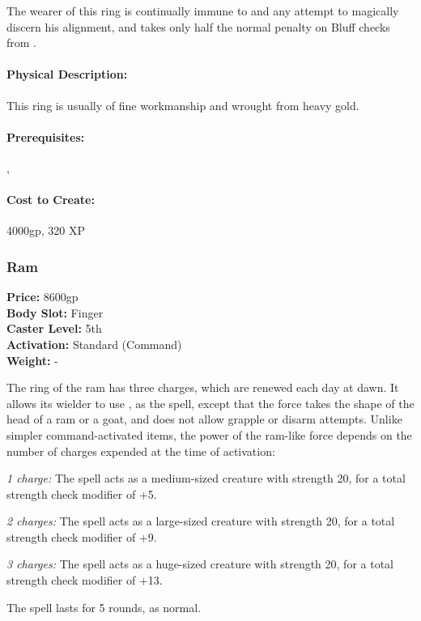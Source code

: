 The wearer of this ring is continually immune to  and any attempt to magically discern his alignment, and takes only half the normal penalty on Bluff checks from .

\paragraph{Physical Description:} This ring is usually of fine workmanship and wrought from heavy gold.

\paragraph{Prerequisites:} , 

\paragraph{Cost to Create:} 4000gp, 320 XP
\subsubsection{Ram}
\label{Item:Ram}
   \textbf{Price:} 8600gp
\\ \textbf{Body Slot:} Finger
\\ \textbf{Caster Level:} 5th
\\ \textbf{Activation:} Standard (Command)
\\ \textbf{Weight:} -

The ring of the ram has three charges, which are renewed each day at dawn. It allows its wielder to use , as the spell, except that the force takes the shape of the head of a ram or a goat, and does not allow grapple or disarm attempts. Unlike simpler command-activated items, the power of the ram-like force depends on the number of charges expended at the time of activation:
\begin{list}{}{\leftmargin=1em}
\item \emph{1 charge:} The spell acts as a medium-sized creature with strength 20, for a total strength check modifier of +5.
\item \emph{2 charges:} The spell acts as a large-sized creature with strength 20, for a total strength check modifier of +9.
\item \emph{3 charges:} The spell acts as a huge-sized creature with strength 20, for a total strength check modifier of +13.
\end{list}
The spell lasts for 5 rounds, as normal.

